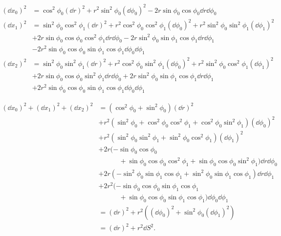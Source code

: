 	\begin{align*}
	(\dd x_0)^2 &= \cos^2 \phi_0 (\dd r)^2 + r^2\sin^2\phi_0 (\dd\phi_0)^2 -2r\sin\phi_0\cos\phi_0 \dd r \dd \phi_0 \\
	(\dd x_1)^2 &= \sin^2 \phi_0 \cos^2 \phi_1 (\dd r)^2 + r^2\cos^2 \phi_0 \cos^2 \phi_1 (\dd\phi_0)^2 + r^2\sin^2 \phi_0 \sin^2 \phi_1 (\dd \phi_1)^2 \\
		&+ 2r\sin \phi_0 \cos \phi_0 \cos^2 \phi_1 \dd r \dd\phi_0 - 2r \sin^2 \phi_0 \sin \phi_1 \cos \phi_1 \dd r \dd \phi_1 \\
		&- 2r^2\sin \phi_0\cos \phi_0 \sin \phi_1 \cos \phi_1 \dd\phi_0 \dd \phi_1 \\
	(\dd x_2)^2 &= \sin^2 \phi_0 \sin^2 \phi_1 (\dd r)^2 + r^2\cos^2 \phi_0 \sin^2 \phi_1 (\dd \phi_0)^2 + r^2\sin^2 \phi_0 \cos^2 \phi_1 (\dd \phi_1)^2 \\
	&+ 2r \sin \phi_0 \cos \phi_0 \sin^2 \phi_1 \dd r \dd \phi_0 + 2r \sin^2 \phi_0 \sin \phi_1 \cos \phi_1 \dd r \dd \phi_1 \\
	&+ 2r^2 \sin \phi_0 \cos \phi_0 \sin \phi_1 \cos \phi_1 \dd \phi_0 \dd \phi_1
	\end{align*}

	\begin{align*}
	(\dd x_0)^2 + (\dd x_1)^2 + (\dd x_2)^2 &= (\cos^2 \phi_0 + \sin^2 \phi_0) (\dd r)^2 \\
		&+ r^2(\sin^2\phi_0 + \cos^2 \phi_0 \cos^2 \phi_1 + \cos^2 \phi_0 \sin^2 \phi_1) (\dd\phi_0)^2 \\
		&+ r^2(\sin^2 \phi_0 \sin^2 \phi_1 + \sin^2 \phi_0 \cos^2 \phi_1) (\dd \phi_1)^2 \\
		&+ 2r(-\sin\phi_0\cos\phi_0 \\
		&\hspace{3em}+ \sin \phi_0 \cos \phi_0 \cos^2 \phi_1 + \sin \phi_0 \cos \phi_0 \sin^2 \phi_1)  \dd r \dd \phi_0 \\
		&+ 2r(- \sin^2 \phi_0 \sin \phi_1 \cos \phi_1 + \sin^2 \phi_0 \sin \phi_1 \cos \phi_1) \dd r \dd \phi_1 \\
		&+ 2r^2(- \sin \phi_0\cos \phi_0 \sin \phi_1 \cos \phi_1 \\
		&\hspace{3em} + \sin \phi_0 \cos \phi_0 \sin \phi_1 \cos \phi_1) \dd\phi_0 \dd \phi_1 \\
		&= (\dd r)^2 + r^2 ( (\dd\phi_0)^2 + \sin^2 \phi_0 (\dd \phi_1)^2 ) \\
		&= (\dd r)^2 + r^2 \dd S^2 .
	\end{align*}







